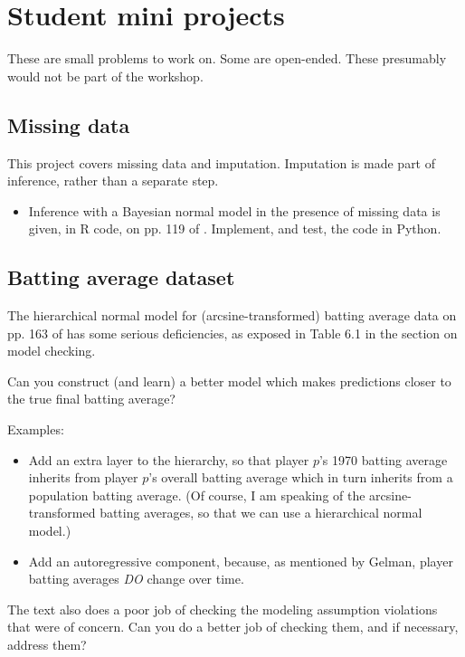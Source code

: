 \documentclass{article} %
\begin{document}
\section{Student mini projects}

These are small problems to work on.  Some are open-ended.  These presumably would not be part of the workshop.

\subsection{Missing data}

This project covers missing data and imputation.  Imputation is made part of inference,  rather than a separate step. 

\begin{itemize}
\item  Inference with a Bayesian normal model in the presence of missing data is given,  in R code,  on pp. 119 of \cite{hoff2009first}.    Implement,  and test,  the code in Python.
\end{itemize}

\subsection{Batting average dataset}

The hierarchical normal model for (arcsine-transformed) batting average data on pp.  163 of \cite{gelman2013bayesian} has some serious deficiencies,  as exposed in Table 6.1 in the section on model checking.    

Can you construct (and learn) a better model which makes predictions closer to the true final batting average?
 
Examples:
\begin{itemize}
\item Add an extra layer to the hierarchy,  so that player $p$'s 1970 batting average inherits from player $p$'s overall batting average which in turn inherits from a population batting average.  (Of course,  I am speaking of the arcsine-transformed batting averages,  so that we can use a hierarchical normal model.)
\item Add an autoregressive component, because,  as mentioned by Gelman,  player batting averages \textit{DO} change over time. 
\end{itemize}

The text also does a poor job of checking the modeling assumption violations that were of concern.   Can you do a better job of checking them,  and if necessary,  address them?
\end{document}
